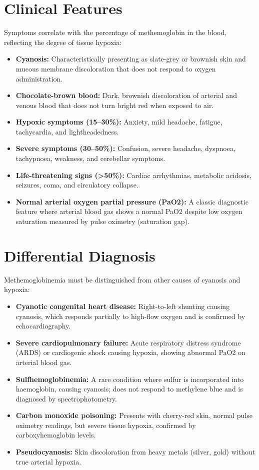\section*{Clinical Features}
Symptoms correlate with the percentage of methemoglobin in the blood, reflecting the degree of tissue hypoxia:
\begin{itemize}
    \item \textbf{Cyanosis:} Characteristically presenting as slate-grey or brownish skin and mucous membrane discoloration that does not respond to oxygen administration.
    \item \textbf{Chocolate-brown blood:} Dark, brownish discoloration of arterial and venous blood that does not turn bright red when exposed to air.
    \item \textbf{Hypoxic symptoms (15--30\%):} Anxiety, mild headache, fatigue, tachycardia, and lightheadedness.
    \item \textbf{Severe symptoms (30--50\%):} Confusion, severe headache, dyspnoea, tachypnoea, weakness, and cerebellar symptoms.
    \item \textbf{Life-threatening signs (>50\%):} Cardiac arrhythmias, metabolic acidosis, seizures, coma, and circulatory collapse.
    \item \textbf{Normal arterial oxygen partial pressure (PaO2):} A classic diagnostic feature where arterial blood gas shows a normal PaO2 despite low oxygen saturation measured by pulse oximetry (saturation gap).
\end{itemize}

\section*{Differential Diagnosis}
Methemoglobinemia must be distinguished from other causes of cyanosis and hypoxia:
\begin{itemize}
    \item \textbf{Cyanotic congenital heart disease:} Right-to-left shunting causing cyanosis, which responds partially to high-flow oxygen and is confirmed by echocardiography.
    \item \textbf{Severe cardiopulmonary failure:} Acute respiratory distress syndrome (ARDS) or cardiogenic shock causing hypoxia, showing abnormal PaO2 on arterial blood gas.
    \item \textbf{Sulfhemoglobinemia:} A rare condition where sulfur is incorporated into haemoglobin, causing cyanosis; does not respond to methylene blue and is diagnosed by spectrophotometry.
    \item \textbf{Carbon monoxide poisoning:} Presents with cherry-red skin, normal pulse oximetry readings, but severe tissue hypoxia, confirmed by carboxyhemoglobin levels.
    \item \textbf{Pseudocyanosis:} Skin discoloration from heavy metals (silver, gold) without true arterial hypoxia.
\end{itemize}

